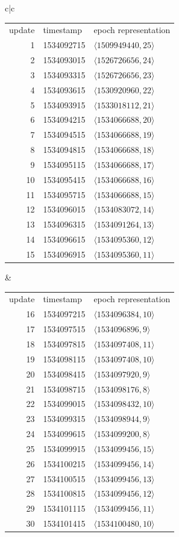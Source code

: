 {\small
\begin{tabular}{c|c}
\begin{tabular}{r|l|l}
update & timestamp & epoch representation\\
1 & 1534092715 & $\langle  1509949440, 25\rangle$\\
2 & 1534093015 & $\langle  1526726656, 24\rangle$\\
3 & 1534093315 & $\langle  1526726656, 23\rangle$\\
4 & 1534093615 & $\langle  1530920960, 22\rangle$\\
5 & 1534093915 & $\langle  1533018112, 21\rangle$\\
6 & 1534094215 & $\langle  1534066688, 20\rangle$\\
7 & 1534094515 & $\langle  1534066688, 19\rangle$\\
8 & 1534094815 & $\langle  1534066688, 18\rangle$\\
9 & 1534095115 & $\langle  1534066688, 17\rangle$\\
10 & 1534095415 & $\langle 1534066688, 16\rangle$\\
11 & 1534095715 & $\langle 1534066688, 15\rangle$\\
12 & 1534096015 & $\langle 1534083072, 14\rangle$\\
13 & 1534096315 & $\langle 1534091264, 13\rangle$\\
14 & 1534096615 & $\langle 1534095360, 12\rangle$\\
15 & 1534096915 & $\langle 1534095360, 11\rangle$
\end{tabular}
&
\begin{tabular}{r|l|l}
update & timestamp & epoch representation\\
16 & 1534097215 & $\langle 1534096384, 10\rangle$\\
17 & 1534097515 & $\langle 1534096896, 9\rangle$\\
18 & 1534097815 & $\langle 1534097408, 11\rangle$\\
19 & 1534098115 & $\langle 1534097408, 10\rangle$\\
20 & 1534098415 & $\langle 1534097920, 9\rangle$\\
21 & 1534098715 & $\langle 1534098176, 8\rangle$\\
22 & 1534099015 & $\langle 1534098432, 10\rangle$\\
23 & 1534099315 & $\langle 1534098944, 9\rangle$\\
24 & 1534099615 & $\langle 1534099200, 8\rangle$\\
25 & 1534099915 & $\langle 1534099456, 15\rangle$\\
26 & 1534100215 & $\langle 1534099456, 14\rangle$\\
27 & 1534100515 & $\langle 1534099456, 13\rangle$\\
28 & 1534100815 & $\langle 1534099456, 12\rangle$\\
29 & 1534101115 & $\langle 1534099456, 11\rangle$\\
30 & 1534101415 & $\langle 1534100480, 10\rangle$
\end{tabular}
\end{tabular}
}


